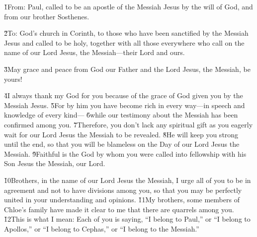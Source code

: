 


\v{1}From: Paul, called to be an apostle of the Messiah Jesus by the will of God, and from our brother Sosthenes.

\v{2}To: God's church in Corinth, to those who have been sanctified by the Messiah Jesus and called to be holy, together with all those everywhere who call on the name of our Lord Jesus, the Messiah---their Lord and ours.

\v{3}May grace and peace from God our Father and the Lord Jesus, the Messiah, be yours!

\v{4}I always thank my God for you because of the grace of God given you by the Messiah Jesus. \v{5}For by him you have become rich in every way---in speech and knowledge of every kind--- \v{6}while our testimony about the Messiah has been confirmed among you. \v{7}Therefore, you don't lack any spiritual gift as you eagerly wait for our Lord Jesus the Messiah to be revealed. \v{8}He will keep you strong until the end, so that you will be blameless on the Day of our Lord Jesus the Messiah. \v{9}Faithful is the God by whom you were called into fellowship with his Son Jesus the Messiah, our Lord.

\v{10}Brothers, in the name of our Lord Jesus the Messiah, I urge all of you to be in agreement and not to have divisions among you, so that you may be perfectly united in your understanding and opinions. \v{11}My brothers, some members of Chloe's family have made it clear to me that there are quarrels among you. \v{12}This is what I mean: Each of you is saying, ``I belong to Paul,'' or ``I belong to Apollos,'' or ``I belong to Cephas,'' or ``I belong to the Messiah.''

